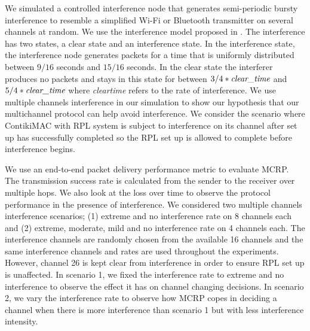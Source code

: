 We simulated a controlled interference node that generates semi-periodic bursty interference to resemble a simplified Wi-Fi or Bluetooth transmitter on several channels at random. We use the interference model proposed in \cite{Boano:2010:MSM:2127940.2127963}. The interference has two states, a clear state and an interference state. 
In the interference state, the interference node generates packets for a time that is uniformly distributed between $9/16$ seconds and $15/16$ seconds. In the clear state the interferer produces no packets and stays in this state for between $3/4 * \emph{clear\textunderscore time}$ and $5/4 * \emph{clear\textunderscore time}$ where \emph{clear\textunderscore time} refers to the rate of interference.
We use multiple channels interference in our simulation to show our hypothesis that our multichannel protocol can help avoid interference. We consider the scenario where ContikiMAC with RPL system is subject to interference on its channel after set up has successfully completed so the RPL set up is allowed to complete before interference begins.

We use an end-to-end packet delivery performance metric to evaluate MCRP. The transmission success rate is calculated from the sender to the receiver over multiple hops. We also look at the loss over time to observe the protocol performance in the presence of interference. We considered two multiple channels interference scenarios; (1) extreme and no interference rate on 8 channels each and (2) extreme, moderate, mild and no interference rate on 4 channels each. The interference channels are randomly chosen from the available 16 channels and the same interference channels and rates are used throughout the experiments. However, channel 26 is kept clear from interference in order to ensure RPL set up is unaffected. In scenario 1, we fixed the interference rate to extreme and no interference to observe the effect it has on channel changing decisions. In scenario 2, we vary the interference rate to observe how MCRP copes in deciding a channel when there is more interference than scenario 1 but with less interference intensity. 

